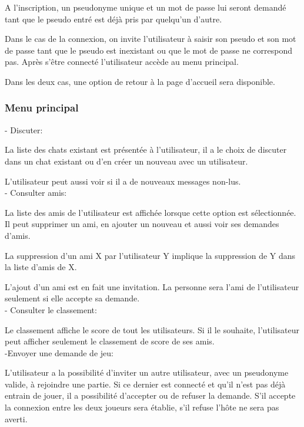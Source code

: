 \documentclass[a4paper,12pt]{article}
\begin{document}
A l'inscription, un pseudonyme unique et un mot de passe lui seront demandé tant que le pseudo entré est déjà pris par quelqu'un d'autre.

Dans le cas de la connexion, on invite l'utilisateur à saisir son pseudo et son mot de passe tant que le pseudo est inexistant ou que le mot de passe ne correspond pas. Après s’être connecté l'utilisateur accède au menu principal.

Dans les deux cas, une option de retour à la page d'accueil sera disponible.

\subsubsection{Menu principal}

- Discuter:

La liste des chats existant est présentée à l'utilisateur, il a le choix de discuter dans un chat existant ou d'en créer un nouveau avec un utilisateur. 

L'utilisateur peut aussi voir si il a de nouveaux messages non-lus.\\

- Consulter amis:

La liste des amis de l'utilisateur est affichée lorsque cette option est sélectionnée. Il peut supprimer un ami, en ajouter un nouveau et aussi voir ses demandes d'amis. 

La suppression d'un ami X par l'utilisateur Y implique la suppression de Y dans la liste d'amis de X. 

L'ajout d'un ami est en fait une invitation. La personne sera l'ami de l'utilisateur seulement si elle accepte sa demande. \\

- Consulter le classement:

Le classement affiche le score de tout les utilisateurs. Si il le souhaite, l'utilisateur peut afficher seulement le classement de score de ses amis. \\

-Envoyer une demande de jeu:

L’utilisateur a la possibilité d’inviter un autre utilisateur, avec un pseudonyme valide, à rejoindre une partie. Si ce dernier est connecté et qu’il n’est pas déjà entrain de jouer, il a possibilité d’accepter ou de refuser la demande. S’il accepte la connexion entre les deux joueurs sera établie, s’il refuse l’hôte ne sera pas averti. \\
\end{document}
